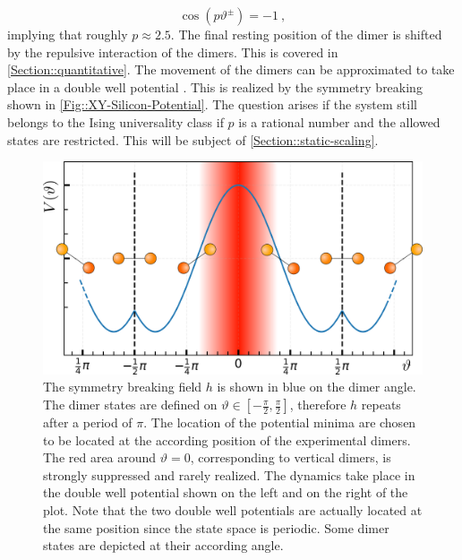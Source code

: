 	\begin{equation}
		\cos \left(p \vartheta^\pm\right) =	-1~,
	\end{equation}
	implying that roughly $ p \approx 2.5$. The final resting position of the dimer is shifted by the repulsive interaction of the dimers. This is covered in \autoref{Section::quantitative}. The movement of the dimers can be approximated to take place in a double well potential \cite{dabrowski1992self}. This is realized by the symmetry breaking shown in \autoref{Fig::XY-Silicon-Potential}. The question arises if the system still belongs to the Ising universality class if $p$ is a rational number and the allowed states are restricted. This will be subject of \autoref{Section::static-scaling}. \\
	
	\begin{figure}[thb]
		\centering
		\includegraphics[width=0.8\linewidth]{graphics/XY-Silicon-potential2.png}
		\caption{The symmetry breaking field $h$ is shown in blue on the dimer angle. The dimer states are defined on $\vartheta \in [-\tfrac{\pi}{2}, \tfrac{\pi}{2}]$, therefore $h$ repeats after a period of $\pi$. The location of the potential minima are chosen to be located at the according position of the experimental dimers. The red area around $\vartheta =	0$, corresponding to vertical dimers, is strongly suppressed and rarely realized. The dynamics take place in the double well potential shown on the left and on the right of the plot. Note that the two double well potentials are actually located at the same position since the state space is periodic. Some dimer states are depicted at their according angle.}
		\label{Fig::XY-Silicon-Potential}
	\end{figure}
